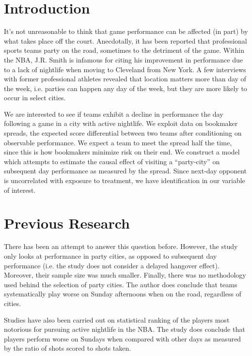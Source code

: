 \documentclass[letterpaper,12pt]{article}
\begin{document}

\section{Introduction}
It's not unreasonable to think that game performance can be affected 
(in part) by what takes place off the court. 
Anecdotally, it has been reported that professional sports teams party on 
the road, sometimes to the detriment of the game.\cite{hoch}
Within the NBA, J.R. Smith is infamous for citing his improvement in performance due to a
lack of nightlife when moving to Cleveland from New York.\cite{price,ley}
A few interviews with former professional athletes revealed that location
matters more than day of the week, i.e. parties can happen any day of the week,
but they are more likely to occur in select cities.

We are interested to see if 
teams exhibit a decline in performance the day following a game in a city 
with active nightlife. We exploit data on bookmaker spreads, the expected score 
differential between two teams after conditioning on observable performance. 
We expect a team to meet the spread half the time, since this is how bookmakers 
minimize risk on their end. We construct a model which attempts to 
estimate the causal effect of  visiting a ``party-city'' on subsequent day 
performance as measured by the spread. Since next-day
opponent is uncorrelated with exposure to treatment, we have identification in our variable of 
interest.

\section{Previous Research}
There has been an attempt to answer this question before.\cite{ezekowitz} 
However, the study only
looks at performance in party cities, as opposed to subsequent day performance (i.e. the study does not consider a delayed hangover effect). Moreover, their sample size was much smaller. 
Finally, there was no methodology used behind the selection of party cities. The author does conclude
that teams systematically play worse on Sunday afternoons when on the road,
regardless of cities.

Studies have also been carried out on statistical ranking of the players
most notorious for pursuing active nightlife in the NBA.\cite{chase} The study
does conclude that players perform worse on Sundays when compared with other days
as measured by the ratio of shots scored to shots taken.
\end{document}
